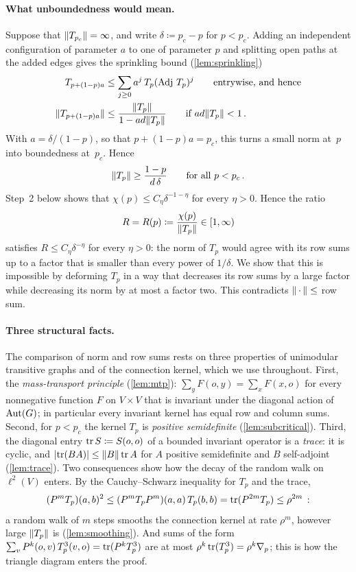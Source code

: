 \paragraph{What unboundedness would mean.}
Suppose that $\lVert T_{p_c}\rVert=\infty$, and write $\delta\coloneqq p_c-p$ for $p<p_c$. Adding an
independent configuration of parameter $a$ to one of parameter $p$ and splitting open paths at the added
edges gives the sprinkling bound (\cref{lem:sprinkling})
\begin{align*}
  T_{p+(1-p)a}&\le\sum_{j\ge0}a^j\,T_p(\operatorname{Adj}\,T_p)^j\qquad\text{entrywise, and hence}\\
  \lVert T_{p+(1-p)a}\rVert&\le\frac{\lVert T_p\rVert}{1-ad\lVert T_p\rVert}\qquad\text{if }ad\lVert T_p\rVert<1\,.
\end{align*}
With $a=\delta/(1-p)$, so that $p+(1-p)a=p_c$, this turns a small norm at~$p$ into boundedness
at~$p_c$. Hence
\begin{equation}\label{eq:norm-lower}
  \lVert T_p\rVert\ge\frac{1-p}{d\,\delta}\qquad\text{for all }p<p_c\,.
\end{equation}
Step~2 below shows that $\chi(p)\le C_\eta\delta^{-1-\eta}$ for every $\eta>0$. Hence the ratio
\begin{equation}\label{eq:R}
  R=R(p)\coloneqq\frac{\chi(p)}{\lVert T_p\rVert}\in[1,\infty)
\end{equation}
satisfies $R\le C_\eta\delta^{-\eta}$ for every $\eta>0$: the norm of $T_p$ would agree with its row
sums up to a factor that is smaller than every power of $1/\delta$. We show that this is impossible by
deforming $T_p$ in a way that decreases its row sums by a large factor while decreasing its norm by at
most a factor two. This contradicts $\lVert\,\cdot\,\rVert\le$ row sum.

\paragraph{Three structural facts.}
The comparison of norm and row sums rests on three properties of unimodular transitive graphs and of the
connection kernel, which we use throughout. First, the \emph{mass-transport principle}
(\cref{lem:mtp}): $\sum_yF(o,y)=\sum_xF(x,o)$ for every nonnegative function $F$ on $V\times V$ that is
invariant under the diagonal action of $\operatorname{Aut}(G)$; in particular every invariant kernel has equal row and
column sums. Second, for $p<p_c$ the kernel $T_p$ is \emph{positive semidefinite}
(\cref{lem:subcritical}). Third, the diagonal entry $\operatorname{tr} S\coloneqq S(o,o)$ of a bounded invariant
operator is a \emph{trace}: it is cyclic, and $\lvert\operatorname{tr}(BA)\rvert\le\lVert B\rVert\operatorname{tr} A$ for $A$ positive
semidefinite and $B$ self-adjoint (\cref{lem:trace}). Two consequences show how the decay of the
random walk on $\ell^2(V)$ enters. By the Cauchy--Schwarz inequality for $T_p$ and the trace,
\begin{equation*}
  (P^mT_p)(a,b)^2\le(P^mT_pP^m)(a,a)\,T_p(b,b)=\operatorname{tr}(P^{2m}T_p)\le\rho^{2m}\,:
\end{equation*}
a random walk of $m$ steps smooths the connection kernel at rate $\rho^m$, however large $\lVert T_p\rVert$ is
(\cref{lem:smoothing}). And sums of the form $\sum_vP^k(o,v)\,T_p^3(v,o)=\operatorname{tr}(P^kT_p^3)$ are at most
$\rho^k\operatorname{tr}(T_p^3)=\rho^k\nabla_p$; this is how the triangle diagram enters the proof.

